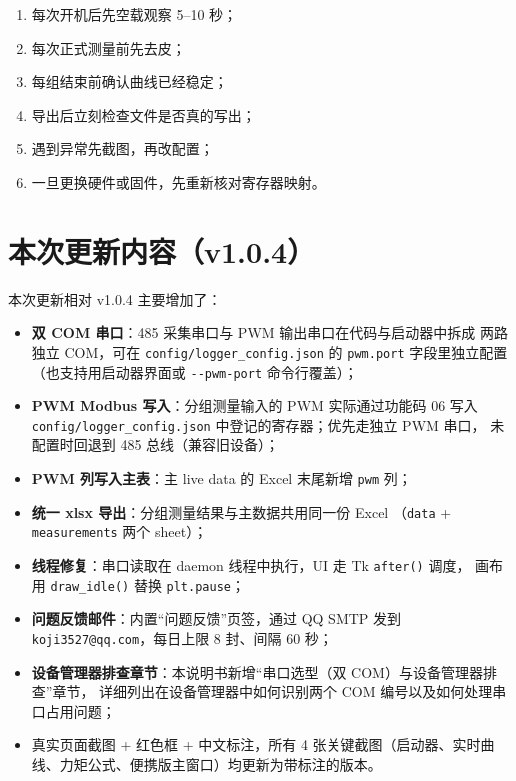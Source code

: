 \documentclass[11pt,a4paper]{ctexart}
\begin{document}
\begin{enumerate}[leftmargin=2em]
  \item 每次开机后先空载观察 5--10 秒；
  \item 每次正式测量前先去皮；
  \item 每组结束前确认曲线已经稳定；
  \item 导出后立刻检查文件是否真的写出；
  \item 遇到异常先截图，再改配置；
  \item 一旦更换硬件或固件，先重新核对寄存器映射。
\end{enumerate}

\section{本次更新内容（v1.0.4）}

本次更新相对 v1.0.4 主要增加了：

\begin{itemize}[leftmargin=2em]
  \item \textbf{双 COM 串口}：485 采集串口与 PWM 输出串口在代码与启动器中拆成
        两路独立 COM，可在 \texttt{config/logger\_config.json} 的
        \texttt{pwm.port} 字段里独立配置（也支持用启动器界面或
        \texttt{-\/-pwm-port} 命令行覆盖）；
  \item \textbf{PWM Modbus 写入}：分组测量输入的 PWM 实际通过功能码 06 写入
        \texttt{config/logger\_config.json} 中登记的寄存器；优先走独立 PWM 串口，
        未配置时回退到 485 总线（兼容旧设备）；
  \item \textbf{PWM 列写入主表}：主 live data 的 Excel 末尾新增 \texttt{pwm} 列；
  \item \textbf{统一 xlsx 导出}：分组测量结果与主数据共用同一份 Excel
        （\texttt{data} + \texttt{measurements} 两个 sheet）；
  \item \textbf{线程修复}：串口读取在 daemon 线程中执行，UI 走 Tk \texttt{after()} 调度，
        画布用 \texttt{draw\_idle()} 替换 \texttt{plt.pause}；
  \item \textbf{问题反馈邮件}：内置“问题反馈”页签，通过 QQ SMTP 发到
        \texttt{koji3527@qq.com}，每日上限 8 封、间隔 60 秒；
  \item \textbf{设备管理器排查章节}：本说明书新增“串口选型（双 COM）与设备管理器排查”章节，
        详细列出在设备管理器中如何识别两个 COM 编号以及如何处理串口占用问题；
  \item 真实页面截图 + 红色框 + 中文标注，所有 4 张关键截图（启动器、实时曲线、力矩公式、便携版主窗口）均更新为带标注的版本。
\end{itemize}
\end{document}
